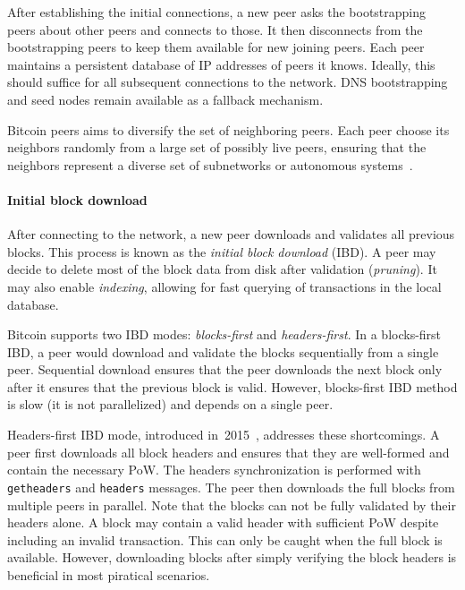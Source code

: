 After establishing the initial connections, a new peer asks the bootstrapping peers about other peers and connects to those.
It then disconnects from the bootstrapping peers to keep them available for new joining peers.
Each peer maintains a persistent database of IP addresses of peers it knows.
Ideally, this should suffice for all subsequent connections to the network.
DNS bootstrapping and seed nodes remain available as a fallback mechanism.

Bitcoin peers aims to diversify the set of neighboring peers.
Each peer choose its neighbors randomly from a large set of possibly live peers, ensuring that the neighbors represent a diverse set of subnetworks or autonomous systems~\cite{Naumenko2019a}.


\paragraph{Initial block download}

After connecting to the network, a new peer downloads and validates all previous blocks.
This process is known as the \textit{initial block download} (IBD).
A peer may decide to delete most of the block data from disk after validation (\textit{pruning}).
It may also enable \textit{indexing}, allowing for fast querying of transactions in the local database.

Bitcoin supports two IBD modes: \textit{blocks-first} and \textit{headers-first}.
In a blocks-first IBD, a peer would download and validate the blocks sequentially from a single peer.
Sequential download ensures that the peer downloads the next block only after it ensures that the previous block is valid.
However, blocks-first IBD method is slow (it is not parallelized) and depends on a single peer.

Headers-first IBD mode, introduced in~2015~\cite{Core2015}, addresses these shortcomings.
A peer first downloads all block headers and ensures that they are well-formed and contain the necessary PoW.
The headers synchronization is performed with \texttt{getheaders} and \texttt{headers} messages.
The peer then downloads the full blocks from multiple peers in parallel.
Note that the blocks can not be fully validated by their headers alone.
A block may contain a valid header with sufficient PoW despite including an invalid transaction.
This can only be caught when the full block is available.
However, downloading blocks after simply verifying the block headers is beneficial in most piratical scenarios.


